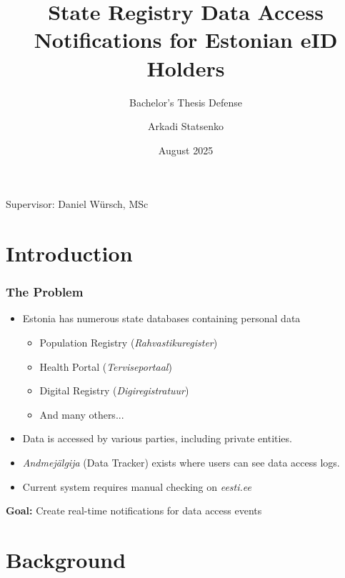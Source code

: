 \documentclass[aspectratio=169,11pt]{beamer}
\title{State Registry Data Access Notifications for Estonian eID Holders}
\subtitle{Bachelor's Thesis Defense}
\author{Arkadi Statsenko}
\institute{University of Tartu\\Computer Science Curriculum}
\date{August 2025}
\begin{document}
\begin{frame}
\titlepage
\begin{center}
\small
Supervisor: Daniel Würsch, MSc
\end{center}
\end{frame}


\section{Introduction}

\begin{frame}
\frametitle{The Problem}
\begin{itemize}
    \item Estonia has numerous state databases containing personal data
    \begin{itemize}
        \item Population Registry (\textit{Rahvastikuregister})
        \item Health Portal (\textit{Terviseportaal})
        \item Digital Registry (\textit{Digiregistratuur})
        \item And many others...
    \end{itemize}
    \item Data is accessed by various parties, including private entities.
    \item {\textit{Andmejälgija} (Data Tracker) exists where users can see data access logs}.
    \item Current system requires manual checking on \textit{eesti.ee}
\end{itemize}

\vspace{0.5cm}
\begin{center}
\textbf{Goal:} Create real-time notifications for data access events
\end{center}
\end{frame}

\section{Background}
\end{document}
